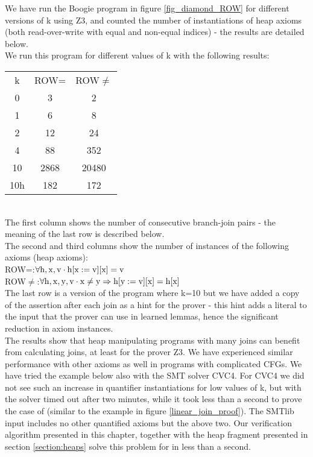 We have run the Boogie program in figure \ref{fig_diamond_ROW} for different versions of k using Z3, and counted the number of instantiations of heap axioms (both read-over-write with equal and non-equal indices) - the results are detailed below.\\
We run this program for different values of k with the following results:\\
\begin{tabular}{c|c|c}
  k & ROW= & ROW$\neq$\\
  0 & 3 & 2 \\
  1 & 6 & 8 \\
  2 & 12 & 24 \\
  4 & 88 & 352 \\
  10 & 2868 & 20480\\
  10h & 182 & 172
\end{tabular}\\
The first column shows the number of consecutive branch-join pairs - the meaning of the last row is described below.\\
The second and third columns show the number of instances of the following axioms (heap axioms):\\
ROW=:$\mathrm{\forall h,x,v \cdot h[x:=v][x] = v}$\\
ROW$\neq$:$\mathrm{\forall h,x,y,v \cdot x\neq y \Rightarrow h[y:=v][x] = h[x]}$\\
The last row is a version of the program where k=10 but we have added a copy of the assertion after each join as a hint for the prover - this hint adds a literal to the input that the prover can use in learned lemmas, hence the significant reduction in axiom instances.\\
The results show that heap manipulating programs with many joins can benefit from calculating joins, at least for the prover Z3. We have experienced similar performance with other axioms as well in programs with complicated CFGs.
We have tried the example below also with the SMT solver CVC4. For CVC4 we did not see such an increase in quantifier instantiations for low values of k, but with  the solver timed out after two minutes, while it took less than a second to prove the case of  (similar to the example in figure \ref{linear_join_proof}). The SMTlib input includes no other quantified axioms but the above two. Our verification algorithm presented in this chapter, together with the heap fragment presented in section \ref{section:heaps} solve this problem for  in less than a second.

